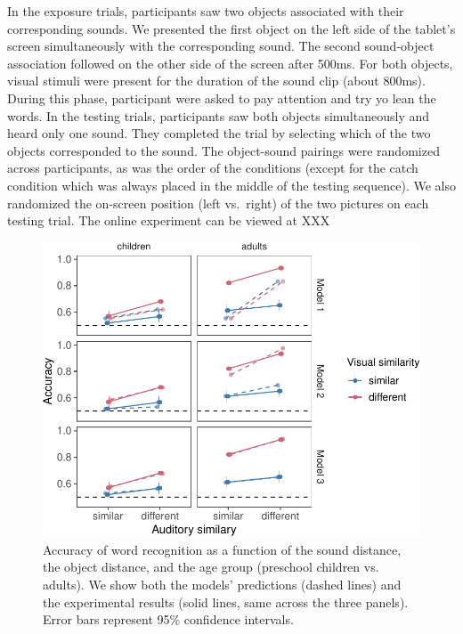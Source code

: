 \documentclass[english,,man]{apa6}
\begin{document}
In the exposure trials, participants saw two objects associated with their corresponding sounds. We presented the first object on the left side of the tablet's screen simultaneously with the corresponding sound. The second sound-object association followed on the other side of the screen after 500ms. For both objects, visual stimuli were present for the duration of the sound clip (about 800ms). During this phase, participant were asked to pay attention and try yo lean the words. In the testing trials, participants saw both objects simultaneously and heard only one sound. They completed the trial by selecting which of the two objects corresponded to the sound. The object-sound pairings were randomized across participants, as was the order of the conditions (except for the catch condition which was always placed in the middle of the testing sequence). We also randomized the on-screen position (left vs.~right) of the two pictures on each testing trial. The online experiment can be viewed at XXX

\begin{figure}[h]

{\centering \includegraphics{ms_blind_files/figure-latex/allData-1} 

}

\caption{Accuracy of word recognition as a function of the sound distance, the object distance, and the age group (preschool children vs. adults). We show both the models' predictions (dashed lines) and the experimental results (solid lines, same across the three panels). Error bars represent 95\% confidence intervals.}\label{fig:allData}
\end{figure}
\end{document}
